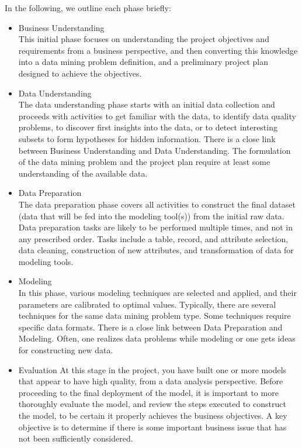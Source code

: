 In the following, we outline each phase briefly:
\begin{itemize}
\item Business Understanding\\
This initial phase focuses on understanding the project objectives and requirements from a
business perspective, and then converting this knowledge into a data mining problem
definition, and a preliminary project plan designed to achieve the objectives.
\item  Data Understanding\\
The data understanding phase starts with an initial data collection and proceeds with activities
to get familiar with the data, to identify data quality problems, to discover first
insights into the data, or to detect interesting subsets to form hypotheses for hidden
information.
There is a close link between Business Understanding and Data Understanding. The
formulation of the data mining problem and the project plan require at least some
understanding of the available data.
\item  Data Preparation\\
The data preparation phase covers all activities to construct the final dataset (data that will be
fed into the modeling tool(s)) from the initial raw data. Data preparation tasks are likely to be
performed multiple times, and not in any prescribed order. Tasks include a table, record, and attribute selection, data cleaning, construction of new attributes, and transformation of data for
modeling tools.
\item Modeling\\
In this phase, various modeling techniques are selected and applied, and their parameters are
calibrated to optimal values. Typically, there are several techniques for the same data mining
problem type. Some techniques require specific data formats.
There is a close link between Data Preparation and Modeling. Often, one realizes data
problems while modeling or one gets ideas for constructing new data.
\item Evaluation
At this stage in the project, you have built one or more models that appear to have high quality,
from a data analysis perspective. Before proceeding to the final deployment of the model, it is
important to more thoroughly evaluate the model, and review the steps executed to construct
the model, to be certain it properly achieves the business objectives. A key objective is to
determine if there is some important business issue that has not been sufficiently considered.

\end{itemize}
